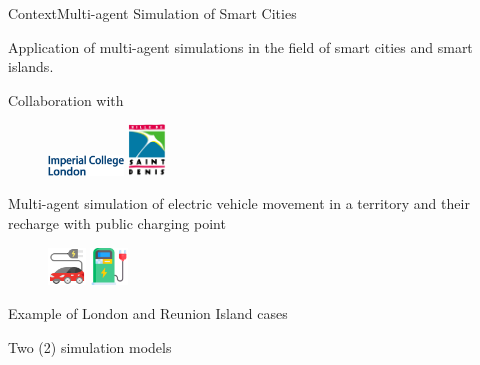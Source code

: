 \begin{frame}{Context}{Multi-agent Simulation of Smart Cities}
\par Application of multi-agent \alert{simulations} in the field of smart cities and smart islands. 
\medbreak
\par Collaboration with 
    \begin{figure}
	\includegraphics[width=2cm]{assets/icl.png}
	\hspace{2cm}
	\includegraphics[width=1cm]{assets/saintDenis.png}
    \end{figure}
\medbreak
\par Multi-agent simulation of \alert{electric vehicle} movement in a territory and their recharge with \alert{public charging point}
    \begin{figure}
	\includegraphics[width=1cm]{figures/electric-car.png}
	\hspace{2cm}
	\includegraphics[width=1cm]{figures/charging.png}
    \end{figure}
\par Example of London and Reunion Island cases
\par Two (2) simulation models
    
\end{frame}

